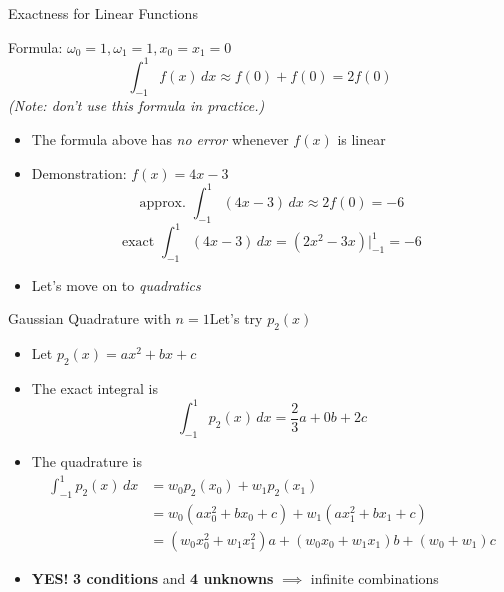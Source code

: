 \documentclass[10pt]{beamer}
\begin{document}
\begin{frame}{Exactness for Linear Functions}

\begin{block}{Formula: $\omega_0=1,\omega_1=1,x_0=x_1=0$ }
$$
    \int_{-1}^1 f(x)\,dx \approx f(0)+f(0) = 2f(0)
$$   
\textit{(Note: don't use this formula in practice.)}
\end{block}
\begin{itemize}
    \item The formula above has \textit{no error} whenever $f(x)$ is linear
    \item Demonstration: $f(x)=4x-3$
    $$
        \text{approx. }\int_{-1}^1 (4x-3)\,dx \approx 2f(0)=-6
    $$
    $$
        \text{exact }\int_{-1}^1 (4x-3)\,dx = (2x^2-3x)|_{-1}^1=-6
    $$
    \item<2> Let's move on to \textit{quadratics}
\end{itemize}
\end{frame}
\begin{frame}{Gaussian Quadrature with $n=1$}{Let's try $p_2(x)$}
\begin{itemize}
    \item Let  $p_2(x) = ax^2 + bx + c$
    \item The exact integral is 
        \begin{equation*}
        \int_{-1}^1 p_2(x) \,dx = \frac{2}{3} a + 0 b + 2c \tag{*} 
        \end{equation*}
    \item The quadrature is 
        \begin{align*}
        \int_{-1}^{1} p_2(x)\, dx &= w_0 p_2(x_0) + w_1 p_2(x_1)\\
                                  &= w_0 (a x_0^2 + bx_0 + c) + w_1 (a x_1^2 + bx_1 + c) \\
                                  & = (w_0  x_0^2 + w_1  x_1^2)a + (w_0x_0 +w_1x_1) b + (w_0 + w_1)c \tag{**} 
        \end{align*}
    \item<2> \textbf{YES!} \textbf{3 conditions} and \textbf{4 unknowns} $\implies$ infinite combinations
\end{itemize}
\end{frame}
\end{document}
